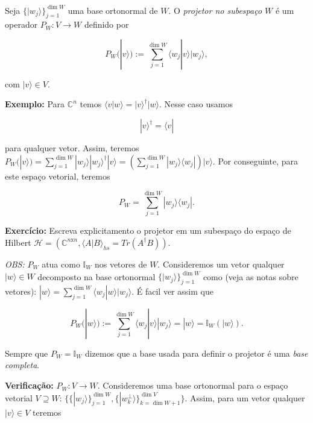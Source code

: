 \documentclass[11pt]{article}
\begin{document}
Seja \(\{|w_{j}\rangle\}_{j=1}^{\dim W}\) uma base ortonormal de \(W\).
O \emph{projetor no subespaço \(W\)} é um operador
\(P_{W}:V\rightarrow W\) definido por

\begin{equation}
P_{W}(|v\rangle) := \sum_{j=1}^{\dim W}\langle w_{j}|v\rangle|w_{j}\rangle,
\end{equation}

com \(|v\rangle\in V\).

\textbf{Exemplo:} Para \(\mathbb{C}^{n}\) temos
\(\langle v|w\rangle = |v\rangle^{\dagger}|w\rangle\). Nesse caso usamos

\begin{equation}
|v\rangle^{\dagger} = \langle v|
\end{equation}

para qualquer vetor. Assim, teremos
\(P_{W}(|v\rangle) = \sum_{j=1}^{\dim W}|w_{j}\rangle|w_{j}\rangle^{\dagger}|v\rangle = (\sum_{j=1}^{\dim W}|w_{j}\rangle\langle w_{j}|)|v\rangle\).
Por conseguinte, para este espaço vetorial, teremos

\begin{equation}
P_{W} = \sum_{j=1}^{\dim W}|w_{j}\rangle\langle w_{j}|.
\end{equation}

\textbf{Exercício:} Escreva explicitamento o projetor em um subespaço do
espaço de Hilbert
\(\mathcal{H}=\left(\mathbb{C}^{n\mathrm{x}n},\langle A|B\rangle_{hs}=Tr(A^{\dagger}B)\right)\).

    \emph{OBS:} \(P_{W}\) atua como \(\mathbb{I}_{W}\) nos vetores de \(W\).
Consideremos um vetor qualquer \(|w\rangle\in W\) decomposto na base
ortonormal \(\{|w_{j}\rangle\}_{j=1}^{\dim W}\) como (veja as notas
sobre vetores):
\(|w\rangle=\sum_{j=1}^{\dim W}\langle w_{j}|w\rangle|w_{j}\rangle\). É
facil ver assim que

\begin{equation}
P_{W}(|w\rangle) := \sum_{j=1}^{\dim W}\langle w_{j}|v\rangle|w_{j}\rangle = |w\rangle = \mathbb{I}_{W}(|w\rangle).
\end{equation}

Sempre que \(P_{W}= \mathbb{I}_{W}\) dizemos que a base usada para
definir o projetor é uma \emph{base completa}.

    \textbf{Verificação:} \(P_{W}:V\rightarrow W\). Consideremos uma base
ortonormal para o espaço vetorial \(V\supseteq W\):
\(\{\{|w_{j}\rangle\}_{j=1}^{\dim W},\{|w^{\perp}_{k}\rangle\}_{k=\dim W+1}^{\dim V}\}\).
Assim, para um vetor qualquer \(|v\rangle\in V\) teremos
\end{document}
